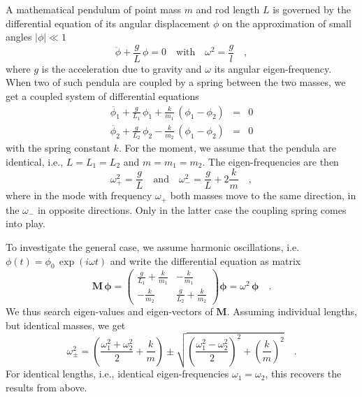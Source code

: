 A mathematical pendulum of point mass $m$ and rod length $L$ is governed by the differential equation of its angular displacement $\phi$ on the approximation of small angles $|\phi| \ll 1$
\begin{equation}
 \ddot{\phi} + \frac{g}{L} \, \phi = 0 \quad \text{with} \quad \omega^2 = \frac{g}{l}  \quad , 
\end{equation}
where $g$ is the acceleration due to gravity and $\omega$ its angular eigen-frequency. When two of such pendula are coupled by a spring between the two masses, we get a coupled system of differential equations
\begin{eqnarray}
 \ddot{\phi_1} + \frac{g}{L_1} \, \phi_1  + \frac{k}{m_1} \, \left( \phi_1  - \phi_2 \right)  & = &  0  \\
 \ddot{\phi_2} + \frac{g}{L_2} \, \phi_2  - \frac{k}{m_2} \, \left( \phi_1  - \phi_2 \right)  & = &  0  
\end{eqnarray}
with the spring constant $k$.  For the moment, we assume that the pendula are identical, i.e., $L = L_1 = L_2$ and $m = m_1 =m_2$. The eigen-frequencies are then
\begin{equation}
 \omega_{+}^2 = \frac{g}{L} \quad \text{and} \quad 
  \omega_{-}^2 = \frac{g}{L}  + 2 \frac{k}{m} \quad ,
\end{equation}
where in the mode with frequency $\omega_{+}$ both masses move to the same direction, in the $\omega_{-}$ in opposite directions. Only in the latter case the coupling spring comes into play.

To investigate the general case, we assume harmonic oscillations, i.e. $\phi(t) = \phi_0 \, \exp (i \omega t)$ and write the differential equation as matrix
\begin{equation} \boldsymbol{M \, \phi}	 = 
\begin{pmatrix}
  \frac{g}{L_1} +  \frac{k}{m_1}&  - \frac{k}{m_1}\\
 - \frac{k}{m_2} &  \frac{g}{L_2} +  \frac{k}{m_2}
\end{pmatrix}  \boldsymbol{\phi}	= \omega^2   \, \boldsymbol{\phi}
\quad .
\end{equation}
We thus search eigen-values and eigen-vectors of  $\boldsymbol{M}$. Assuming individual lengths, but identical masses, we get
\begin{equation}
 \omega_{\pm}^2 = \left( \frac{\omega_1^2 + \omega_2^2}{2}  + \frac{k}{m} \right)
  \pm \sqrt{  \left( \frac{\omega_1^2 - \omega_2^2}{2}   \right)^2 + \left(  \frac{k}{m} \right)^2 } \quad .
\end{equation}
For identical lengths, i.e., identical eigen-frequencies $\omega_1 = \omega_2$, this recovers the results from above.


